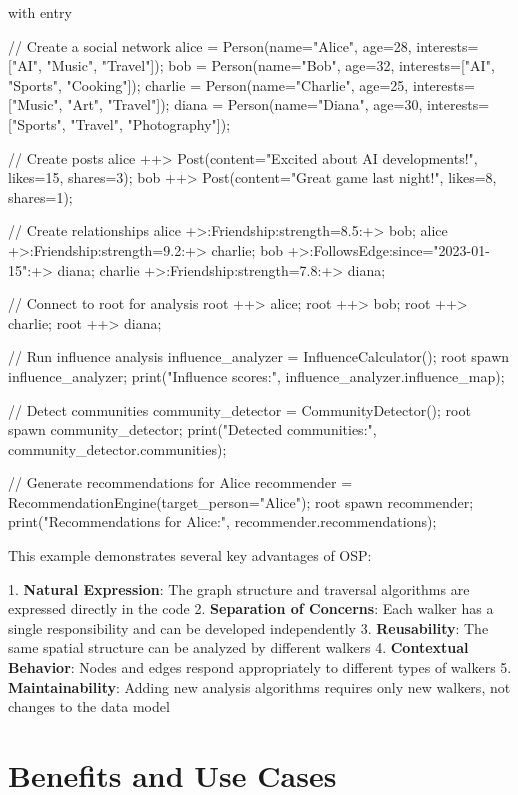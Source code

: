 \begin{jacblock}
with entry {
    // Create a social network
    alice = Person(name="Alice", age=28, interests=["AI", "Music", "Travel"]);
    bob = Person(name="Bob", age=32, interests=["AI", "Sports", "Cooking"]);
    charlie = Person(name="Charlie", age=25, interests=["Music", "Art", "Travel"]);
    diana = Person(name="Diana", age=30, interests=["Sports", "Travel", "Photography"]);

    // Create posts
    alice ++> Post(content="Excited about AI developments!", likes=15, shares=3);
    bob ++> Post(content="Great game last night!", likes=8, shares=1);

    // Create relationships
    alice +>:Friendship:strength=8.5:+> bob;
    alice +>:Friendship:strength=9.2:+> charlie;
    bob +>:FollowsEdge:since="2023-01-15":+> diana;
    charlie +>:Friendship:strength=7.8:+> diana;

    // Connect to root for analysis
    root ++> alice;
    root ++> bob;
    root ++> charlie;
    root ++> diana;

    // Run influence analysis
    influence_analyzer = InfluenceCalculator();
    root spawn influence_analyzer;
    print("Influence scores:", influence_analyzer.influence_map);

    // Detect communities
    community_detector = CommunityDetector();
    root spawn community_detector;
    print("Detected communities:", community_detector.communities);

    // Generate recommendations for Alice
    recommender = RecommendationEngine(target_person="Alice");
    root spawn recommender;
    print("Recommendations for Alice:", recommender.recommendations);
}
\end{jacblock}

This example demonstrates several key advantages of OSP:

1. \textbf{Natural Expression}: The graph structure and traversal algorithms are expressed directly in the code
2. \textbf{Separation of Concerns}: Each walker has a single responsibility and can be developed independently
3. \textbf{Reusability}: The same spatial structure can be analyzed by different walkers
4. \textbf{Contextual Behavior}: Nodes and edges respond appropriately to different types of walkers
5. \textbf{Maintainability}: Adding new analysis algorithms requires only new walkers, not changes to the data model

\section{Benefits and Use Cases}

